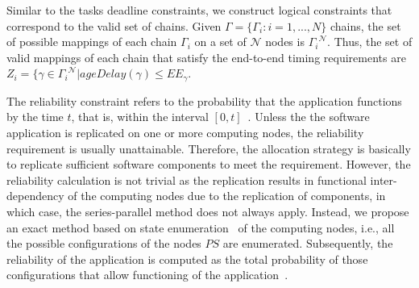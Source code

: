 Similar to the tasks deadline constraints, we construct logical constraints that correspond to the valid set of chains. Given $\Gamma =\{\Gamma_i:i=1,...,N\}$ chains, the set of possible mappings of each chain $\Gamma_i$ on a set of $\mathcal{N}$ nodes is ${\Gamma_i}^\mathcal{N}$. Thus, the set of valid mappings of each chain that satisfy the end-to-end timing requirements are $Z_i=\{\gamma\in {\Gamma_i}^\mathcal{N}| ageDelay(\gamma) \leq {EE}_\gamma$.

The reliability constraint refers to the probability that the application functions by the time $t$, that is, within the interval  $[0,t]$~\cite{Goel1985SoftwareApplicability}. %
Unless the the software application is replicated on one or more computing nodes, the reliability requirement is usually unattainable. Therefore, the allocation strategy is basically to replicate sufficient software components to meet the requirement. However, the reliability calculation is not trivial as the replication results in functional inter-dependency of the computing nodes due to the replication of components, in which case, the series-parallel method does not always apply. Instead, we propose an exact method based on state enumeration~\cite{Lucet1999ExactReliability} of the computing nodes, i.e., all the possible configurations of the nodes $PS$ are enumerated. Subsequently, the reliability of the application is computed as the total probability of those configurations that allow functioning of the application~\cite{Mahmud5222}.


